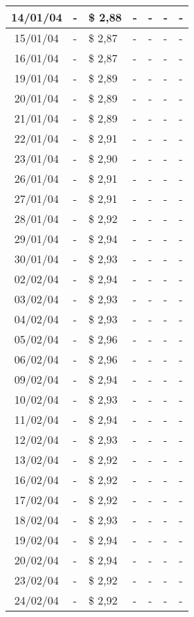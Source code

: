 \begin{center}
\begin{longtable}{|c|p{1.5cm}|p{1.5cm}|p{1.5cm}|p{1.5cm}|p{1.5cm}|p{1.5cm}|}
14/01/04 & - & \$ 2,88 & - & - & - & - \\ \hline
15/01/04 & - & \$ 2,87 & - & - & - & - \\ \hline
16/01/04 & - & \$ 2,87 & - & - & - & - \\ \hline
19/01/04 & - & \$ 2,89 & - & - & - & - \\ \hline
20/01/04 & - & \$ 2,89 & - & - & - & - \\ \hline
21/01/04 & - & \$ 2,89 & - & - & - & - \\ \hline
22/01/04 & - & \$ 2,91 & - & - & - & - \\ \hline
23/01/04 & - & \$ 2,90 & - & - & - & - \\ \hline
26/01/04 & - & \$ 2,91 & - & - & - & - \\ \hline
27/01/04 & - & \$ 2,91 & - & - & - & - \\ \hline
28/01/04 & - & \$ 2,92 & - & - & - & - \\ \hline
29/01/04 & - & \$ 2,94 & - & - & - & - \\ \hline
30/01/04 & - & \$ 2,93 & - & - & - & - \\ \hline
02/02/04 & - & \$ 2,94 & - & - & - & - \\ \hline
03/02/04 & - & \$ 2,93 & - & - & - & - \\ \hline
04/02/04 & - & \$ 2,93 & - & - & - & - \\ \hline
05/02/04 & - & \$ 2,96 & - & - & - & - \\ \hline
06/02/04 & - & \$ 2,96 & - & - & - & - \\ \hline
09/02/04 & - & \$ 2,94 & - & - & - & - \\ \hline
10/02/04 & - & \$ 2,93 & - & - & - & - \\ \hline
11/02/04 & - & \$ 2,94 & - & - & - & - \\ \hline
12/02/04 & - & \$ 2,93 & - & - & - & - \\ \hline
13/02/04 & - & \$ 2,92 & - & - & - & - \\ \hline
16/02/04 & - & \$ 2,92 & - & - & - & - \\ \hline
17/02/04 & - & \$ 2,92 & - & - & - & - \\ \hline
18/02/04 & - & \$ 2,93 & - & - & - & - \\ \hline
19/02/04 & - & \$ 2,94 & - & - & - & - \\ \hline
20/02/04 & - & \$ 2,94 & - & - & - & - \\ \hline
23/02/04 & - & \$ 2,92 & - & - & - & - \\ \hline
24/02/04 & - & \$ 2,92 & - & - & - & - \\ \hline

\end{longtable}
\end{center}
